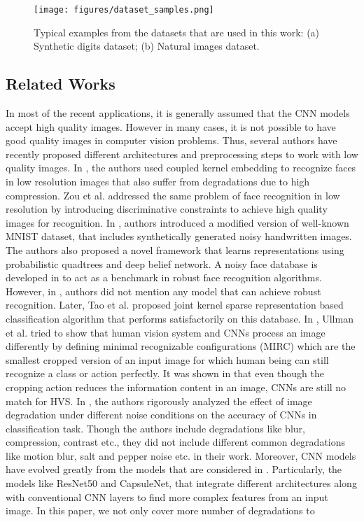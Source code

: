 \documentclass[10pt, journal, compsoc]{IEEEtran}
\begin{document}
\vspace{0.7cm}

\begin{figure}
\texttt{[image: figures/dataset\_samples.png]}
\caption{Typical examples from the datasets that are used in this work: (a) Synthetic digits dataset; (b) Natural images dataset.}
\label{fig:dataset_samples}
\end{figure}

\subsection{Related Works}\label{sec:relatedwork}
In most of the recent applications, it is generally assumed that the CNN models accept high quality images. However in many cases, it is not possible to have good quality images in computer vision problems. Thus, several authors have recently proposed different architectures and preprocessing steps to work with low quality images. In \cite{ren2012coupled}, the authors used coupled kernel embedding to recognize faces in low resolution images that also suffer from degradations due to high compression. Zou et al. \cite{zou2012very} addressed the same problem of face recognition in low resolution by introducing discriminative constraints to achieve high quality images for recognition. In \cite{basu2017learning}, authors introduced a modified version of well-known MNIST dataset, that includes synthetically generated noisy handwritten images. The authors also proposed a novel framework that learns representations using probabilistic quadtrees and deep belief network. A noisy face database is developed in \cite{karam2015quality} to act as a benchmark in robust face recognition algorithms. However, in \cite{karam2015quality}, authors did not mention any model that can achieve robust recognition. Later, Tao et al. \cite{tao2016multi} proposed joint kernel sparse representation based classification algorithm that performs satisfactorily on this database. In \cite{ullman2016atoms}, Ullman et al. tried to show that human vision system and CNNs process an image differently by defining minimal recognizable configurations (MIRC) which are the smallest cropped version of an input image for which human being can still recognize a class or action perfectly. It was shown in \cite{ullman2016atoms} that even though the cropping action reduces the information content in an image, CNNs are still no match for HVS. In \cite{dodge2016understanding}, the authors rigorously analyzed the effect of image degradation under different noise conditions on the accuracy of CNNs in classification task. Though the authors include degradations like blur, compression, contrast etc., they did not include different common degradations like motion blur, salt and pepper noise etc. in their work. Moreover, CNN models have evolved greatly from the models that are considered in \cite{dodge2016understanding}. Particularly, the models like ResNet50 and CapsuleNet, that integrate different architectures along with conventional CNN layers to find more complex features from an input image. In this paper, we not only cover more number of degradations to 
\end{document}
